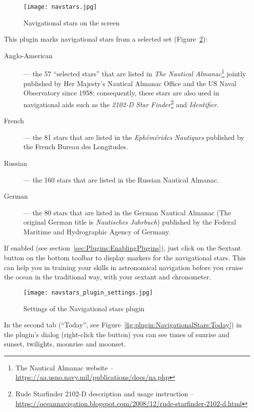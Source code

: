 \begin{figure}[ht]
\texttt{[image: navstars.jpg]}
\caption{Navigational stars on the screen}
\label{fig:plugin:NavigationalStars}
\end{figure}

\noindent This plugin marks navigational stars from a selected set (Figure~\ref{fig:plugin:NavigationalStars:Settings}):
\begin{description}
\item[Anglo-American] --- the 57 ``selected stars'' that are listed in \emph{The Nautical Almanac}\footnote{The Nautical Almanac
  website -- \url{https://aa.usno.navy.mil/publications/docs/na.php}} jointly published by Her Majesty's Nautical Almanac Office
  and the US Naval Observatory since 1958; consequently, these stars are also used in navigational aids such as the
  \emph{2102-D Star Finder}\footnote{Rude Starfinder 2102-D description and usage instruction --
    \url{https://oceannavigation.blogspot.com/2008/12/rude-starfinder-2102-d.html}} and \emph{Identifier}. 
\item[French] --- the 81 stars that are listed in the \emph{Ephémérides Nautiques} published by the French Bureau des Longitudes.
\item[Russian] --- the 160 stars that are listed in the Russian Nautical Almanac.
\item[German] --- the 80 stars that are listed in the German Nautical Almanac (The original German title is \textit{Nautisches Jahrbuch})
  published by the Federal Maritime and Hydrographic Agency of Germany.
\end{description}
If enabled (see section~\ref{sec:Plugins:EnablingPlugins}), just click
on the Sextant button  on
the bottom toolbar to display markers for the navigational stars. This
can help you in training your skills in astronomical navigation before
you cruise the ocean in the traditional way, with your sextant and
chronometer.

\begin{figure}[htbp]
  \centering\texttt{[image: navstars\_plugin\_settings.jpg]}
  \caption{Settings of the Navigational stars plugin}
  \label{fig:plugin:NavigationalStars:Settings}
\end{figure}

In the second tab (``Today'', see Figure~\ref{fig:plugin:NavigationalStars:Today}) in the plugin's dialog (right-click the button)
you can see times of sunrise and sunset, twilights, moonrise and moonset. 

